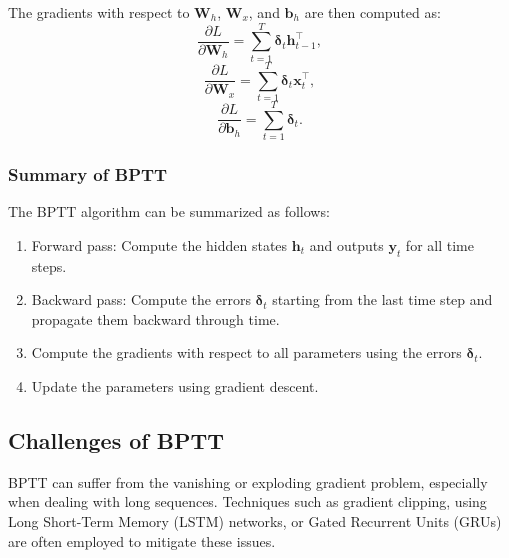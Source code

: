 \documentclass{article}
\begin{document}
The gradients with respect to \( \mathbf{W}_h \), \( \mathbf{W}_x \), and \( \mathbf{b}_h \) are then computed as:
\[
\frac{\partial L}{\partial \mathbf{W}_h} = \sum_{t=1}^T \mathbf{\delta}_t \mathbf{h}_{t-1}^\top,
\]
\[
\frac{\partial L}{\partial \mathbf{W}_x} = \sum_{t=1}^T \mathbf{\delta}_t \mathbf{x}_t^\top,
\]
\[
\frac{\partial L}{\partial \mathbf{b}_h} = \sum_{t=1}^T \mathbf{\delta}_t.
\]

\subsubsection*{Summary of BPTT}

The BPTT algorithm can be summarized as follows:
\begin{enumerate}
   \item Forward pass: Compute the hidden states \( \mathbf{h}_t \) and outputs \( \mathbf{y}_t \) for all time steps.
   \item Backward pass: Compute the errors \( \mathbf{\delta}_t \) starting from the last time step and propagate them backward through time.
   \item Compute the gradients with respect to all parameters using the errors \( \mathbf{\delta}_t \).
   \item Update the parameters using gradient descent.
\end{enumerate}

\subsection*{Challenges of BPTT}

BPTT can suffer from the vanishing or exploding gradient problem, especially when dealing with long sequences. Techniques such as gradient clipping, using Long Short-Term Memory (LSTM) networks, or Gated Recurrent Units (GRUs) are often employed to mitigate these issues.
\end{document}
